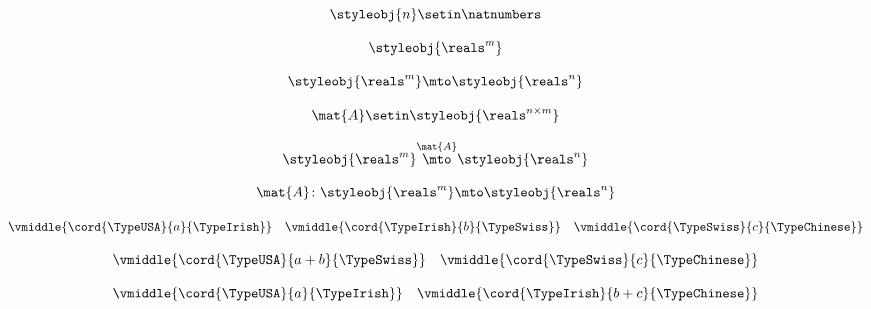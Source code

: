 {\begin{forslides}
        \begin{equation}
            \label{eq:semicats-slides-121}
            \styleobj{n} \setin \natnumbers
        \end{equation}

        \begin{equation}
            \label{eq:semicats-slides-122}
            \styleobj{\reals^m}
        \end{equation}

        \begin{equation}
            \label{eq:semicats-slides-123}
            \styleobj{\reals^m} \mto \styleobj{\reals^n}
        \end{equation}

        \begin{equation}
            \label{eq:semicats-slides-124}
            \mat{A} \setin \styleobj{\reals^{n \times m}}
        \end{equation}

        \begin{equation}
            \label{eq:semicats-slides-125}
            \styleobj{\reals^m} \overset{\mat{A}}{\mto} \styleobj{\reals^n}
        \end{equation}

        \begin{equation}
            \label{eq:semicats-slides-126}
            \mat{A} \colon \styleobj{\reals^m} \mto \styleobj{\reals^n}
        \end{equation}

        \begin{equation}
            \label{eq:semicats-slides-127}
            \vmiddle{\cord{\TypeUSA}{a}{\TypeIrish}} \quad \vmiddle{\cord{\TypeIrish}{b}{\TypeSwiss}} \quad \vmiddle{\cord{\TypeSwiss}{c}{\TypeChinese}}
        \end{equation}

        \begin{equation}
            \label{eq:semicats-slides-128}
            \vmiddle{\cord{\TypeUSA}{a + b}{\TypeSwiss}} \quad \vmiddle{\cord{\TypeSwiss}{c}{\TypeChinese}}
        \end{equation}

        \begin{equation}
            \label{eq:semicats-slides-129}
            \vmiddle{\cord{\TypeUSA}{a}{\TypeIrish}} \quad \vmiddle{\cord{\TypeIrish}{b + c}{\TypeChinese}}
        \end{equation}


\end{forslides}}
